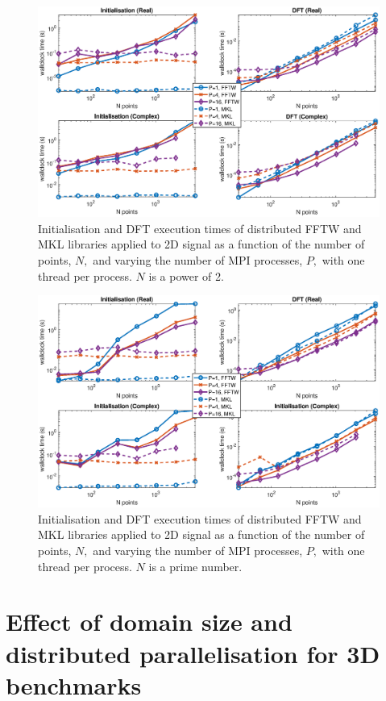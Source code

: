 \documentclass[a4paper]{article}
\begin{document}
\begin{figure}[htb]
    \centering
    \includegraphics[width=0.9\linewidth]{../results/fftw_mkl_2_2d_mpi.eps}
  \caption{Initialisation and DFT execution times of distributed FFTW and MKL libraries applied to 2D signal as a function of the
    number of points, $N,$ and varying the number of MPI processes, $P,$ with one thread per process. $N$ is a power of 2.}
  \label{2DDistFFTWMKL2}
\end{figure}


\begin{figure}[htb]
    \centering
    \includegraphics[width=0.9\linewidth]{../results/fftw_mkl_prime_2d_mpi.eps}
  \caption{Initialisation and DFT execution times of distributed FFTW and MKL libraries applied to 2D signal as a function of the
    number of points, $N,$ and varying the number of MPI processes, $P,$ with one thread per process. $N$ is a prime number.}
  \label{2DDistFFTWMKLprime}
\end{figure}



\section{Effect of domain size and distributed parallelisation for 3D benchmarks}\label{Sec:3DDistr}
\end{document}

